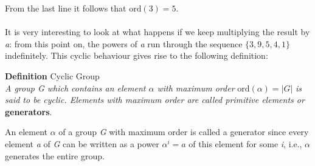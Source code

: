 From the last line it follows that $\text{ord}(3)=5$.\\\\
It is very interesting to look at what happens if we keep multiplying the result by \textit{a}: from this point on, the powers of \textit{a} run through the sequence $\{3,9,5,4,1\}$ indefinitely. This cyclic behaviour gives rise to the following definition:
\begin{framed}
    \hfill\break\textbf{Definition} Cyclic Group\\
    \textit{A group G which contains an element $\alpha$ with maximum order} $\text{ord}(\alpha)=|G|$ \textit{is said to be cyclic. Elements with maximum order are called primitive elements or} \textbf{generators}. 
\end{framed}
\hfill\break
An element $\alpha$ of a group \textit{G} with maximum order is called a generator since every element \textit{a} of \textit{G} can be written as a power $\alpha^i=a$ of this element for some \textit{i}, i.e., $\alpha$ generates the entire group.

